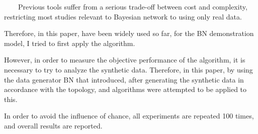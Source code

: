~~~~Previous tools suffer from a serious trade-off between cost and complexity, restricting most studies relevant to Bayesian network to using only real data.

Therefore, in this paper, have been widely used so far, for the BN demonstration model, I tried to first apply the algorithm.

However, in order to measure the objective performance of the algorithm, it is necessary to try to analyze the synthetic data. Therefore, in this paper, by using the data generator BN that introduced, after generating the synthetic data in accordance with the topology, and algorithms were attempted to be applied to this.

In order to avoid the influence of chance, all experiments are repeated 100 times, and overall results are reported.